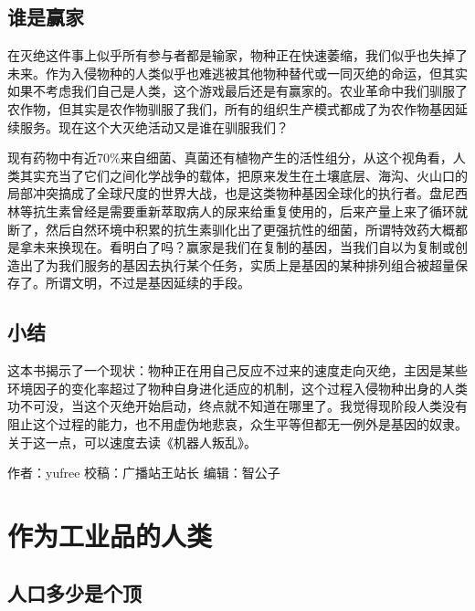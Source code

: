 \documentclass[]{book}
\begin{document}
\hypertarget{ux8c01ux662fux8d62ux5bb6}{%
\subsection{谁是赢家}\label{ux8c01ux662fux8d62ux5bb6}}

在灭绝这件事上似乎所有参与者都是输家，物种正在快速萎缩，我们似乎也失掉了未来。作为入侵物种的人类似乎也难逃被其他物种替代或一同灭绝的命运，但其实如果不考虑我们自己是人类，这个游戏最后还是有赢家的。农业革命中我们驯服了农作物，但其实是农作物驯服了我们，所有的组织生产模式都成了为农作物基因延续服务。现在这个大灭绝活动又是谁在驯服我们？

现有药物中有近70\%来自细菌、真菌还有植物产生的活性组分，从这个视角看，人类其实充当了它们之间化学战争的载体，把原来发生在土壤底层、海沟、火山口的局部冲突搞成了全球尺度的世界大战，也是这类物种基因全球化的执行者。盘尼西林等抗生素曾经是需要重新萃取病人的尿来给重复使用的，后来产量上来了循环就断了，然后自然环境中积累的抗生素驯化出了更强抗性的细菌，所谓特效药大概都是拿未来换现在。看明白了吗？赢家是我们在复制的基因，当我们自以为复制或创造出了为我们服务的基因去执行某个任务，实质上是基因的某种排列组合被超量保存了。所谓文明，不过是基因延续的手段。

\hypertarget{ux5c0fux7ed3-2}{%
\subsection{小结}\label{ux5c0fux7ed3-2}}

这本书揭示了一个现状：物种正在用自己反应不过来的速度走向灭绝，主因是某些环境因子的变化率超过了物种自身进化适应的机制，这个过程入侵物种出身的人类功不可没，当这个灭绝开始启动，终点就不知道在哪里了。我觉得现阶段人类没有阻止这个过程的能力，也不用虚伪地悲哀，众生平等但都无一例外是基因的奴隶。关于这一点，可以速度去读《机器人叛乱》。

作者：yufree
校稿：广播站王站长
编辑：智公子

\hypertarget{ux4f5cux4e3aux5de5ux4e1aux54c1ux7684ux4ebaux7c7b}{%
\section{作为工业品的人类}\label{ux4f5cux4e3aux5de5ux4e1aux54c1ux7684ux4ebaux7c7b}}

\hypertarget{ux4ebaux53e3ux591aux5c11ux662fux4e2aux9876}{%
\subsection{人口多少是个顶}\label{ux4ebaux53e3ux591aux5c11ux662fux4e2aux9876}}
\end{document}
